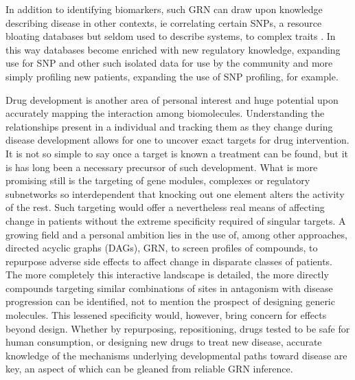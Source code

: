 In addition to identifying biomarkers, such GRN can draw upon knowledge describing disease in other contexts, ie correlating certain SNPs, a resource bloating databases but seldom used to describe systems, to complex traits \cite{platig2016bipartite}. In this way databases become enriched with new regulatory knowledge, expanding use for SNP and other such isolated data for use by the community and more simply profiling new patients, expanding the use of SNP profiling, for example.

Drug development is another area of personal interest and huge potential upon accurately mapping the interaction among biomolecules. Understanding the relationships present in a individual and tracking them as they change during disease development allows for one to uncover exact targets for drug intervention. It is not so simple to say once a target is known a treatment can be found, but it is has long been a necessary precursor of such development. What is more promising still is the targeting of gene modules, complexes or regulatory subnetworks so interdependent that knocking out one element alters the activity of the rest. Such targeting would offer a nevertheless real means of affecting change in patients without the extreme specificity required of singular targets. A growing field and a personal ambition lies in the use of, among other approaches, directed acyclic graphs (DAGs), \ie GRN, to screen profiles of compounds, to repurpose adverse side effects to affect change in disparate classes of patients. The more completely this interactive landscape is detailed, the more directly compounds targeting similar combinations of sites in antagonism with disease progression can be identified, not to mention the prospect of designing generic molecules. This lessened specificity would, however, bring concern for effects beyond design. Whether by repurposing, \ie repositioning, drugs tested to be safe for human consumption, or designing new drugs to treat new disease, accurate knowledge of the mechanisms underlying developmental paths toward disease are key, an aspect of which can be gleaned from reliable GRN inference.
